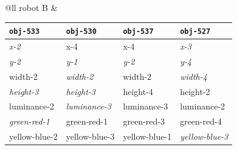 {\begin{center}
  \begin{tabular}{@{}ll}
    robot B &
    \begin{tabular}{@{}llll@{}}
      {\tt obj-533} & {\tt obj-530} & {\tt obj-537} & {\tt obj-527} \\
      \hline
      \textcolor{dark}{\slshape  x-2} & {  x-4} & {  x-4} & \textcolor{dark}{\slshape  x-3} \\
      \textcolor{dark}{\slshape y-2} & \textcolor{dark}{\slshape y-1} & \textcolor{dark}{\slshape y-2} & \textcolor{dark}{\slshape y-4 }\\
      { width-2} & \textcolor{dark}{\slshape width-2} & { width-2} & \textcolor{dark}{\slshape width-4 }\\
      \textcolor{dark}{\slshape height-3} & \textcolor{dark}{\slshape height-3} & { height-4} & { height-2 }\\
      { luminance-2} & \textcolor{dark}{\slshape luminance-3} & { luminance-3} & { luminance-2 }\\
      \textcolor{dark}{\slshape green-red-1} & { green-red-1} & { green-red-3} & { green-red-4 }\\
      { yellow-blue-2} & { yellow-blue-3} & { yellow-blue-1} & \textcolor{dark}{\slshape yellow-blue-3}\\
      \hline
    
    \end{tabular}
  \end{tabular}
  \end{center}}


